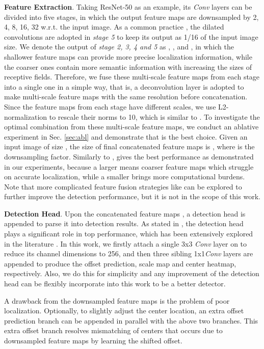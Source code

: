 \textbf{Feature Extraction}.
Taking ResNet-50 as an example, its \emph{Conv} layers can be divided into five stages, in which the output feature maps are downsampled by 2, 4, 8, 16, 32 w.r.t. the input image. As a common practice \cite{wang2017repulsion,Song_2018_ECCV}, the dilated convolutions are adopted in \emph{stage 5} to keep its output as 1/16 of the input image size. We denote the output of \emph{stage 2, 3, 4 and 5} as , ,  and , in which the shallower feature maps can provide more precise localization information, while the coarser ones contain more semantic information with increasing the sizes of receptive fields. Therefore, we fuse these multi-scale feature maps from each stage into a single one in a simple way, that is, a deconvolution layer is adopted to make multi-scale feature maps with the same resolution before concatenation. Since the feature
maps from each stage have different scales, we use L2-normalization to rescale their norms to 10, which is similar to \cite{Lin_2018_ECCV}. To investigate the optimal combination from these multi-scale feature maps, we conduct an ablative experiment in Sec. \ref{sec:abl} and demonstrate that  is the best choice. Given an input image of size , the size of final concatenated feature maps is , where  is the downsampling factor. Similarly to \cite{Song_2018_ECCV},  gives the best performance as demonstrated in our experiments, because a larger  means coarser feature maps which struggle on accurate localization, while a smaller  brings more computational burdens.
Note that more complicated feature fusion strategies like \cite{lin2016feature,Kim_2018_ECCV,Kong_2018_ECCV} can be explored to further improve the detection performance, but it is not in the scope of this work.

\textbf{Detection Head}.
Upon the concatenated feature maps , a detection head is appended to parse it into detection results. As stated in \cite{rfbnet}, the detection head plays a significant role in top performance, which has been extensively explored in the literature \cite{fu2017dssd,rfbnet,li2017light,li2018dsfd}. In this work, we firstly attach a single 3x3 \emph{Conv} layer on  to reduce its channel dimensions to 256, and then three sibling 1x1\emph{Conv} layers are appended to produce the offset prediction, scale map and center heatmap, respectively. Also, we do this for simplicity and any improvement of the detection head  \cite{fu2017dssd,rfbnet,li2017light,li2018dsfd} can be flexibly incorporate into this work to be a better detector.

A drawback from the downsampled feature maps is the problem of poor localization. Optionally, to slightly adjust the center location, an extra offset prediction branch can be appended in parallel with the above two branches. This extra offset branch resolves mismatching of centers that occurs due to downsampled feature maps by learning the shifted offset.

